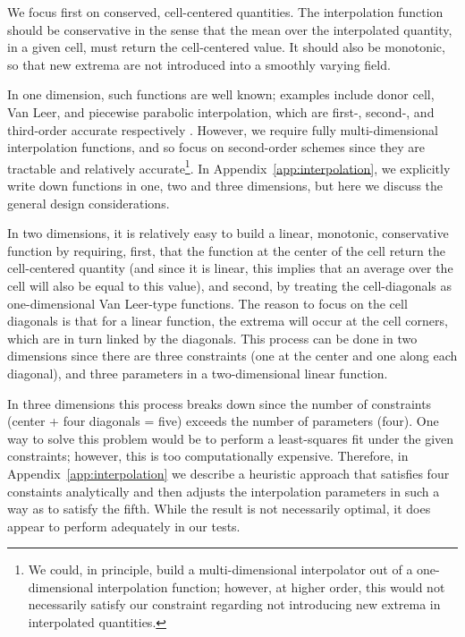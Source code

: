 We focus first on conserved, cell-centered quantities.  The interpolation function should be conservative in the sense that the mean over the interpolated quantity, in a given cell, must return the cell-centered value.  It should also be monotonic, so that new extrema are not introduced into a smoothly varying field.

In one dimension, such functions are well known; examples include
donor cell, Van Leer, and piecewise parabolic interpolation, which are
first-, second-, and third-order accurate respectively
\citep[e.g.,][]{Stone92a}.  However, we require fully
multi-dimensional interpolation functions, and so focus on
second-order schemes since they are tractable and relatively 
accurate\footnote{We could, in principle, build a multi-dimensional
  interpolator out of a one-dimensional interpolation function;
  however, at higher order, this would not necessarily satisfy our
  constraint regarding not introducing new extrema in interpolated quantities.}.  In Appendix~\ref{app:interpolation}, we
explicitly write down functions in one, two and three dimensions, but
here we discuss the general design considerations.

In two dimensions, it is relatively easy to build a linear, monotonic,
conservative function by requiring, first, that the function at the
center of the cell return the cell-centered quantity (and since it is
linear, this implies that an average over the cell will also be equal
to this value), and second, by treating the cell-diagonals as
one-dimensional Van Leer-type functions.  The reason to focus on the
cell diagonals is that for a linear function, the extrema will occur at the cell 
corners, which are in turn linked by the diagonals.  This process can be done in
two dimensions since there are three constraints (one at the center and one along
each diagonal), and three parameters in a two-dimensional linear
function.

In three dimensions this process breaks down since the number of
constraints (center + four diagonals = five) exceeds the number of
parameters (four).  One way to solve this problem would be to perform
a least-squares fit under the given constraints; however, this is
too computationally expensive.  Therefore, in Appendix~\ref{app:interpolation} we describe
a heuristic approach that satisfies four constaints analytically and
then adjusts the interpolation parameters in such a way as to satisfy the fifth.
While the result is not necessarily optimal, it does appear to perform
adequately in our tests.

